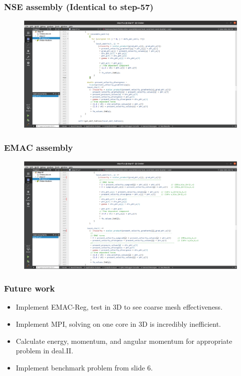 \documentclass{beamer}
\begin{document}
\begin{frame}
\frametitle{NSE assembly (Identical to step-57)}
\begin{figure}
\includegraphics[scale=.18]{NSE_code.png}
\end{figure}
\end{frame}


\begin{frame}
\frametitle{EMAC assembly}
\begin{figure}
\includegraphics[scale=.18]{EMAC_code.png}
\end{figure}
\end{frame}


\begin{frame}
\frametitle{Future work}
\begin{itemize}
\item Implement EMAC-Reg, test in 3D to see coarse mesh effectiveness.
\item Implement MPI, solving on one core in 3D is incredibly inefficient.
\item Calculate energy, momentum, and angular momentum for appropriate problem in deal.II.
\item Implement benchmark problem from slide 6.
\end{itemize}
\end{frame}

\end{document}
